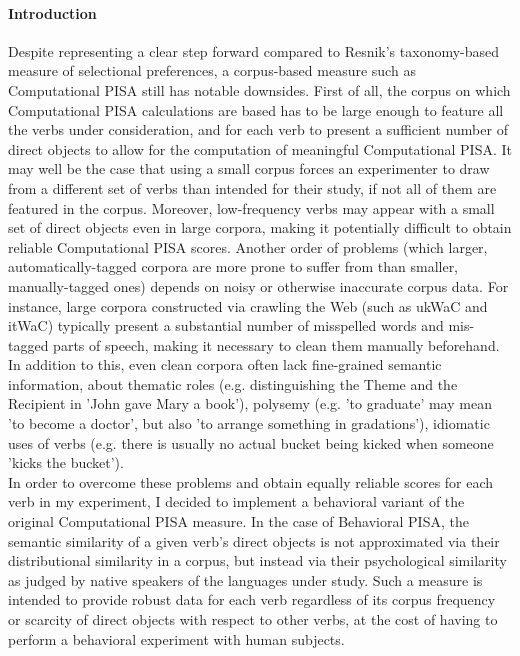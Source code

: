 \paragraph{Introduction} 
Despite representing a clear step forward compared to Resnik's taxonomy-based measure of selectional preferences, a corpus-based measure such as Computational PISA still has notable downsides. First of all, the corpus on which Computational PISA calculations are based has to be large enough to feature all the verbs under consideration, and for each verb to present a sufficient number of direct objects to allow for the computation of meaningful Computational PISA. It may well be the case that using a small corpus forces an experimenter to draw from a different set of verbs than intended for their study, if not all of them are featured in the corpus. Moreover, low-frequency verbs may appear with a small set of direct objects even in large corpora, making it potentially difficult to obtain reliable Computational PISA scores. Another order of problems (which larger, automatically-tagged corpora are more prone to suffer from than smaller, manually-tagged ones) depends on noisy or otherwise inaccurate corpus data. For instance, large corpora constructed via crawling the Web (such as ukWaC and itWaC) typically present a substantial number of misspelled words and mis-tagged parts of speech, making it necessary to clean them manually beforehand. In addition to this, even clean corpora often lack fine-grained semantic information, about thematic roles (e.g. distinguishing the Theme and the Recipient in 'John gave Mary a book'), polysemy (e.g. 'to graduate' may mean 'to become a doctor', but also 'to arrange something in gradations'), idiomatic uses of verbs (e.g. there is usually no actual bucket being kicked when someone 'kicks the bucket').\\
In order to overcome these problems and obtain equally reliable scores for each verb in my experiment, I decided to implement a behavioral variant of the original Computational PISA measure. In the case of Behavioral PISA, the semantic similarity of a given verb's direct objects is not approximated via their distributional similarity in a corpus, but instead via their psychological similarity as judged by native speakers of the languages under study. Such a measure is intended to provide robust data for each verb regardless of its corpus frequency or scarcity of direct objects with respect to other verbs, at the cost of having to perform a behavioral experiment with human subjects.

